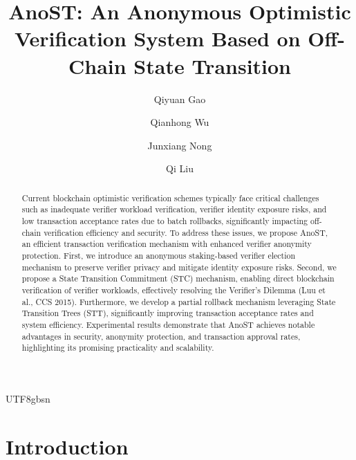 \documentclass[runningheads]{llncs}
\begin{document}
\begin{CJK*}{UTF8}{gbsn}

\title{AnoST: An Anonymous Optimistic Verification System Based on Off-Chain State Transition}


\author{Qiyuan Gao \and
Qianhong Wu \and
Junxiang Nong \and
Qi Liu
}



\maketitle              %
%


\begin{abstract}

Current blockchain optimistic verification schemes typically face critical challenges such as inadequate verifier workload verification, verifier identity exposure risks, and low transaction acceptance rates due to batch rollbacks, significantly impacting off-chain verification efficiency and security. To address these issues, we propose AnoST, an efficient transaction verification mechanism with enhanced verifier anonymity protection. First, we introduce an anonymous staking-based verifier election mechanism to preserve verifier privacy and mitigate identity exposure risks. Second, we propose a State Transition Commitment (STC) mechanism, enabling direct blockchain verification of verifier workloads, effectively resolving the Verifier's Dilemma (Luu et al., CCS 2015). Furthermore, we develop a partial rollback mechanism leveraging State Transition Trees (STT), significantly improving transaction acceptance rates and system efficiency. Experimental results demonstrate that AnoST achieves notable advantages in security, anonymity protection, and transaction approval rates, highlighting its promising practicality and scalability.


\end{abstract}

\section{Introduction}


\end{CJK*}
\end{document}
